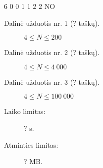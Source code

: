 \documentclass{boi2014-lt}
\begin{document}
	\example
	{
		6  0  0  1  1  2  2
	}
	{
		NO
	}

    \Scoring

    \begin{description}
        \item[Dalinė užduotis nr. 1 (? taškų).] $4 \le N \le 200$
        \item[Dalinė užduotis nr. 2 (? taškų).] $4 \le N \le 4\ 000$
        \item[Dalinė užduotis nr. 3 (? taškų).] $4 \le N \le 100\ 000$
    \end{description}

    \Constraints

    \begin{description}
        \item[Laiko limitas:] ? s.
        \item[Atminties limitas:] ? MB.
    \end{description}
\end{document}
